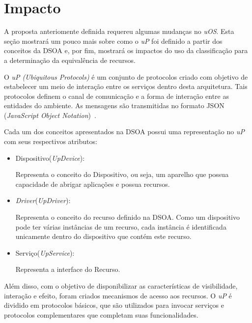 \section{Impacto}
\label{sec:impactoUOS}

A proposta anteriomente definida requereu algumas mudanças no \emph{uOS}. Esta seção mostrará um pouco mais sobre como o \emph{uP} foi definido a partir dos conceitos da DSOA e, por fim, mostrará os impactos do uso da classificação para a determinação da equivalência de recursos.

O \emph{uP (Ubiquitous Protocols)} é um conjunto de protocolos criado com objetivo de estabelecer um meio de interação entre os serviços dentro desta arquitetura. Tais protocolos definem o canal de comunicação e a forma de interação entre as entidades do ambiente. As mensagens são transmitidas no formato JSON (\emph{JavaScript Object Notation})~\cite{json}.

Cada um dos conceitos apresentados na DSOA possui uma representação no \emph{uP} com seus respectivos atributos:

\begin{itemize}
	\item Dispositivo(\emph{UpDevice}):

		Representa o conceito do Dispositivo, ou seja, um aparelho que possua capacidade de abrigar aplicações e possua recursos.

	\item \emph{Driver}(\emph{UpDriver}): 

		Representa o conceito do recurso definido na DSOA. Como um dispositivo pode ter várias instâncias de um recurso, cada instância é identificada unicamente dentro do dispositivo que contém este recurso.

	\item Serviço(\emph{UpService}): 

		Representa a interface do Recurso.
\end{itemize}

Além disso, com o objetivo de disponibilizar as características de visibilidade, interação e efeito, foram criados mecanismos de acesso aos recursos. O \emph{uP} é dividido em protocolos básicos, que são utilizados para invocar serviços e protocolos complementares que completam suas funcionalidades.

